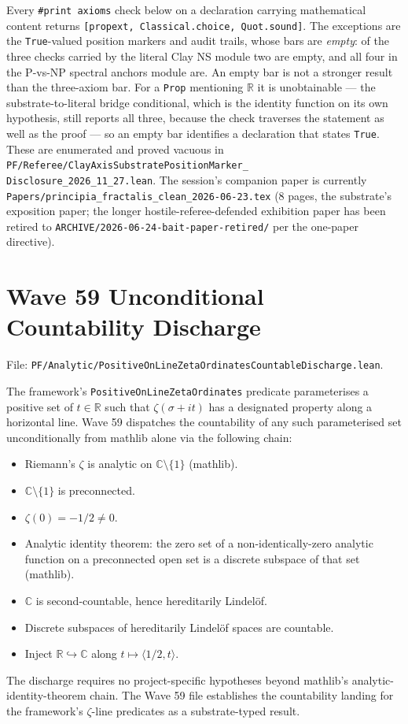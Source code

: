 Every \verb|#print axioms| check below on a declaration carrying
mathematical content returns
\texttt{[propext, Classical.choice, Quot.sound]}. The exceptions are
the \texttt{True}-valued position markers and audit trails, whose
bars are \emph{empty}: of the three checks carried by the literal
Clay NS module two are empty, and all four in the P-vs-NP spectral
anchors module are. An empty bar is not a stronger result than the
three-axiom bar. For a \texttt{Prop} mentioning $\mathbb{R}$ it is
unobtainable --- the substrate-to-literal bridge conditional, which
is the identity function on its own hypothesis, still reports all
three, because the check traverses the statement as well as the
proof --- so an empty bar identifies a declaration that states
\texttt{True}. These are enumerated and proved vacuous in
\texttt{PF/Referee/ClayAxisSubstratePositionMarker\_\\
Disclosure\_2026\_11\_27.lean}. The session's
companion paper is currently
\texttt{Papers/principia\_fractalis\_clean\_2026-06-23.tex}
(8 pages, the substrate's exposition paper; the longer
hostile-referee-defended exhibition paper has been retired to
\texttt{ARCHIVE/2026-06-24-bait-paper-retired/} per the
one-paper directive).

\section{Wave 59 Unconditional Countability Discharge}
\label{sec:wave59-countability}

File: \texttt{PF/Analytic/PositiveOnLineZetaOrdinatesCountableDischarge.lean}.

The framework's \texttt{PositiveOnLineZetaOrdinates} predicate parameterises
a positive set of $t \in \mathbb{R}$ such that $\zeta(\sigma + it)$ has
a designated property along a horizontal line. Wave 59 dispatches the
countability of any such parameterised set unconditionally from mathlib
alone via the following chain:
\begin{itemize}
  \item Riemann's $\zeta$ is analytic on $\mathbb{C} \setminus \{1\}$
    (mathlib).
  \item $\mathbb{C} \setminus \{1\}$ is preconnected.
  \item $\zeta(0) = -1/2 \neq 0$.
  \item Analytic identity theorem: the zero set of a non-identically-zero
    analytic function on a preconnected open set is a discrete subspace
    of that set (mathlib).
  \item $\mathbb{C}$ is second-countable, hence hereditarily Lindel\"of.
  \item Discrete subspaces of hereditarily Lindel\"of spaces are countable.
  \item Inject $\mathbb{R} \hookrightarrow \mathbb{C}$ along
    $t \mapsto \langle 1/2, t \rangle$.
\end{itemize}
The discharge requires no project-specific hypotheses beyond mathlib's
analytic-identity-theorem chain. The Wave 59 file establishes the
countability landing for the framework's $\zeta$-line predicates as a
substrate-typed result.

